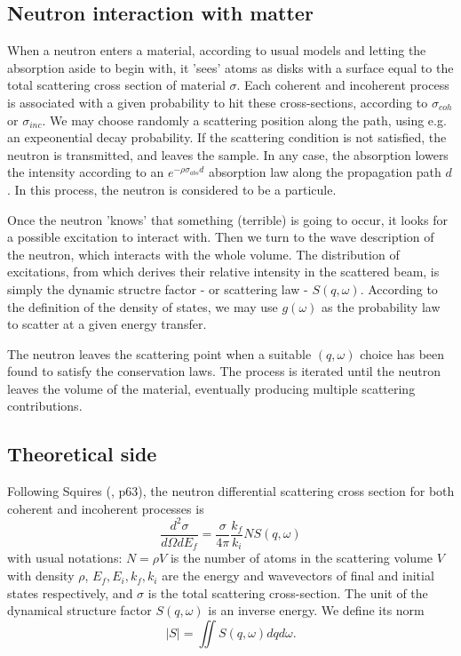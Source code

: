 \subsection{Neutron interaction with matter}

When a neutron enters a material, according to usual models and letting the absorption aside to begin with, it 'sees' atoms as disks with a surface equal to the total scattering cross section of material $\sigma$. Each coherent and incoherent process is associated with a given probability to hit these cross-sections, according to $\sigma_{coh}$ or $\sigma_{inc}$. We may choose randomly a scattering position along the path, using e.g. an expeonential decay probability. If the scattering condition is not satisfied, the neutron is transmitted, and leaves the sample. In any case, the absorption lowers the intensity according to an $e^{-\rho \sigma_{abs}d}$ absorption law along the propagation path $d$. In this process, the neutron is considered to be a particule.

Once the neutron 'knows' that something (terrible) is going to occur, it looks for a possible excitation to interact with. Then we turn to the wave description of the neutron, which interacts with the whole volume. The distribution of excitations, from which derives their relative intensity in the scattered beam, is simply the dynamic structre factor - or scattering law - $S(q,\omega)$. According to the definition of the density of states, we may use $g(\omega)$ as the probability law to scatter at a given energy transfer.

The neutron leaves the scattering point when a suitable $(q, \omega)$ choice has been found to satisfy the conservation laws. The process is iterated until the neutron leaves the volume of the material, eventually producing multiple scattering contributions.

\subsection{Theoretical side}

Following Squires (\cite{squires}, p63), the neutron differential scattering cross section for both coherent and incoherent processes is
\begin{equation}\label{eq:d2sigma}
\frac{d^2\sigma}{d\Omega dE_f} = \frac{\sigma}{4\pi}\frac{k_f}{k_i} N S(q, \omega)
\end{equation}
with usual notations: $N=\rho V$ is the number of atoms in the scattering volume $V$ with density $\rho$, $E_f, E_i, k_f, k_i$ are the energy and wavevectors of final and initial states respectively, and $\sigma$ is the total scattering cross-section. The unit of the dynamical structure factor $S(q,\omega)$ is an inverse energy. We define its norm
\begin{equation}
|S| = \iint S(q,\omega) dq d\omega .
\end{equation}

